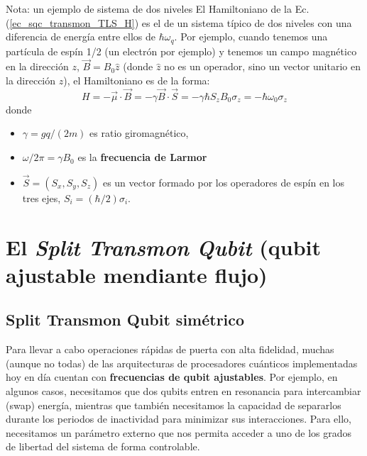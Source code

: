     \begin{mybox_blue}{Nota: un ejemplo de sistema de dos niveles}
        El Hamiltoniano de la Ec. (\ref{ec_sqc_transmon_TLS_H}) es el de un sistema típico de dos niveles con una diferencia de energía entre ellos de $\hbar \omega_q$. Por ejemplo, cuando tenemos una partícula de espín 1/2 (un electrón por ejemplo) y tenemos un campo magnético en la dirección $z$, $\vec{B} = B_0 \hat{z}$ (donde $\hat{z}$ no es un operador, sino un vector unitario en la dirección $z$), el Hamiltoniano es de la forma:
        \begin{equation}
            H = - \vec{\mu} \cdot \vec{B} = - \gamma \vec{B} \cdot \vec{S} = - \gamma \hbar S_z B_0 \sigma_z 
            = - \hbar \omega_0 \sigma_z
        \end{equation}
        donde 
        \begin{itemize}
        	\item $\gamma = gq/(2m)$ es ratio giromagnético,
        	\item $\omega/2 \pi = \gamma B_0 $ es la \textbf{frecuencia de Larmor}
        	\item $\vec{S} = (S_x,S_y,S_z)$ es un vector formado por los operadores de espín en los tres ejes, $S_i = (\hbar/2)\sigma_i$.
        \end{itemize}
    \end{mybox_blue}



        
\newpage
\section{El \textit{Split Transmon Qubit} (qubit ajustable mendiante flujo)} \label{sec_scq_split_transmon}
    
    \subsection{Split Transmon Qubit simétrico} 

    Para llevar a cabo operaciones rápidas de puerta con alta fidelidad, muchas (aunque no todas) de las arquitecturas de procesadores cuánticos implementadas hoy en día cuentan con \textbf{frecuencias de qubit ajustables}. Por ejemplo, en algunos casos, necesitamos que dos qubits entren en resonancia para intercambiar (swap) energía, mientras que también necesitamos la capacidad de separarlos durante los periodos de inactividad para minimizar sus interacciones. Para ello, necesitamos un parámetro externo que nos permita acceder a uno de los grados de libertad del sistema de forma controlable.

